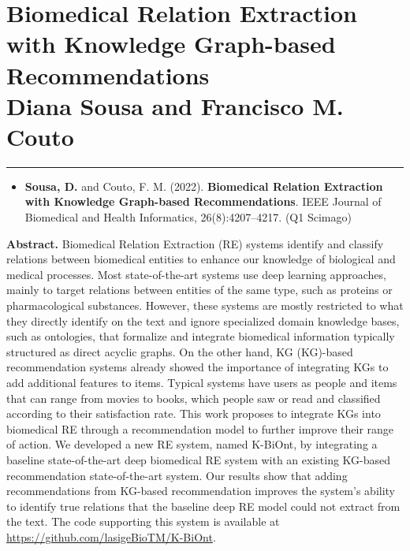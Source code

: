 \hypertarget{4}{}


\chapter[Biomedical Relation Extraction with Knowledge Graph-based Recommendations]
{\huge Biomedical Relation Extraction with Knowledge Graph-based Recommendations \\
\Large \textmd{Diana Sousa and Francisco M. Couto}}

\vspace{-1.6cm}

\begingroup
\color{black}
\par\noindent\rule{\textwidth}{0.4pt}
\endgroup


\begin{itemize}[label=]
    \item{\textbf{Sousa, D.} and Couto, F. M. (2022). \textbf{Biomedical Relation Extraction with Knowledge Graph-based Recommendations}. IEEE Journal of Biomedical and Health Informatics, 26(8):4207–4217. (Q1 Scimago) \citep{sousa2022biomedical}}
\end{itemize}

\textbf{Abstract.} Biomedical Relation Extraction (RE) systems identify and classify relations between biomedical entities to enhance our knowledge of biological and medical processes. Most state-of-the-art systems use deep learning approaches, mainly to target relations between entities of the same type, such as proteins or pharmacological substances. However, these systems are mostly restricted to what they directly identify on the text and ignore specialized domain knowledge bases, such as ontologies, that formalize and integrate biomedical information typically structured as direct acyclic graphs. On the other hand, \acl{KG} (KG)-based recommendation systems already showed the importance of integrating KGs to add additional features to items. Typical systems have users as people and items that can range from movies to books, which people saw or read and classified according to their satisfaction rate. This work proposes to integrate KGs into biomedical RE through a recommendation model to further improve their range of action. We developed a new RE system, named K-BiOnt, by integrating a baseline state-of-the-art deep biomedical RE system with an existing KG-based recommendation state-of-the-art system. Our results show that adding recommendations from KG-based recommendation improves the system's ability to identify true relations that the baseline deep RE model could not extract from the text. The code supporting this system is available at \url{https://github.com/lasigeBioTM/K-BiOnt}.


